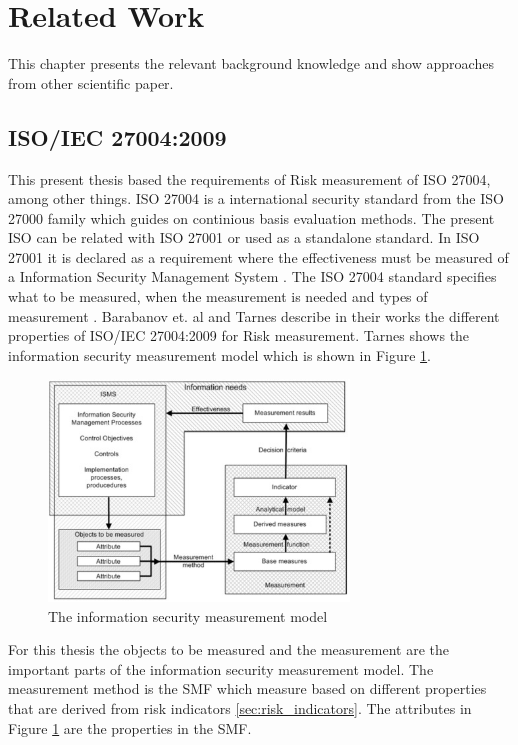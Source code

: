 \section{Related Work}
\label{sec:relWork}

This chapter presents the relevant background knowledge and show approaches from other scientific paper.

\subsection{ISO/IEC 27004:2009}

This present thesis based the requirements of Risk measurement of ISO 27004, among other things. ISO 27004 is a international security standard from the ISO 27000 \cite{DBLP:conf/euspn/MeriahR19} family which guides on continious basis evaluation methods. The present ISO can be related with ISO 27001 or used as a standalone standard. In ISO 27001 it is declared as a requirement where the effectiveness must be measured of a Information Security Management System \cite{barabanov2011information}. The ISO 27004 standard specifies what to be measured, when the measurement is needed and types of measurement \cite{lundholm2011design}. Barabanov et. al \cite{barabanov2011information} and Tarnes \cite{tarnes2012information} describe in their works the different properties of ISO/IEC 27004:2009 for Risk measurement. Tarnes shows the information security measurement model which is shown in Figure \ref{fig:is_measurement_model}.

\begin{figure}[h!]
  \centering
  \includegraphics[width=8cm]{pictures/is_measurement_model.jpg}
  \caption{The information security measurement model \cite{tarnes2012information}}
  \label{fig:is_measurement_model}
\end{figure}

For this thesis the objects to be measured and the measurement are the important parts of the information security measurement model. The measurement method is the SMF which measure based on different properties that are derived from risk indicators \ref{sec:risk_indicators}. The attributes in Figure \ref{fig:is_measurement_model} are the properties in the SMF.

